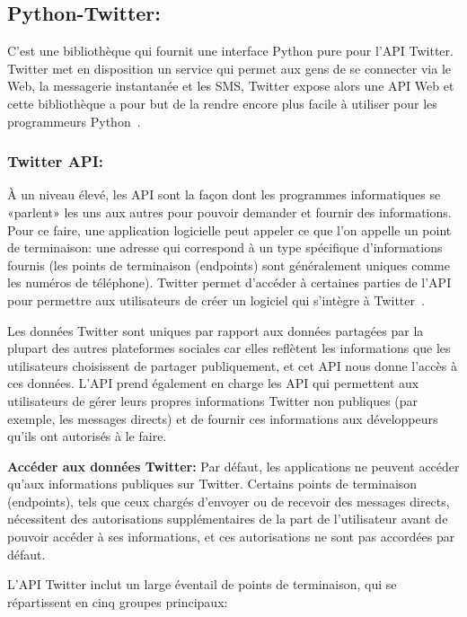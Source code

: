 \subsection{Python-Twitter:}
C'est une bibliothèque qui fournit une interface Python pure pour l'API Twitter. Twitter met en disposition un service qui permet aux gens de se connecter via le Web, la messagerie instantanée et les SMS, Twitter expose alors une API Web et cette bibliothèque a pour but de la rendre encore plus facile à utiliser pour les programmeurs Python~\cite{py-twitter}.

\subsubsection{Twitter API:}
À un niveau élevé, les API sont la façon dont les programmes informatiques se «parlent» les uns aux autres pour pouvoir demander et fournir des informations. Pour ce faire, une application logicielle peut appeler ce que l'on appelle un point de terminaison:
une adresse qui correspond à un type spécifique d'informations fournis (les points de terminaison (endpoints) sont généralement uniques comme les numéros de téléphone).
Twitter permet d'accéder à certaines parties de l'API pour permettre aux utilisateurs de créer un logiciel qui s'intègre à Twitter~\cite{twitterAPI}.

Les données Twitter sont uniques par rapport aux données partagées par la plupart des autres plateformes sociales car elles reflètent les informations que les utilisateurs choisissent de partager publiquement, et cet API nous donne l'accès à ces données.
L'API prend également en charge les API qui permettent aux utilisateurs de gérer leurs propres informations Twitter non publiques (par exemple, les messages directs) et de fournir ces informations aux développeurs qu'ils ont autorisés à le faire.

\textbf{Accéder aux données Twitter:}  Par défaut, les applications ne peuvent accéder qu'aux informations publiques sur Twitter. Certains points de terminaison (endpoints), tels que ceux chargés d'envoyer ou de recevoir des messages directs, nécessitent des autorisations supplémentaires de la part de l'utilisateur avant de pouvoir accéder à ses informations, et ces autorisations ne sont pas accordées par défaut.

L'API Twitter inclut un large éventail de points de terminaison, qui se répartissent en cinq groupes principaux:

